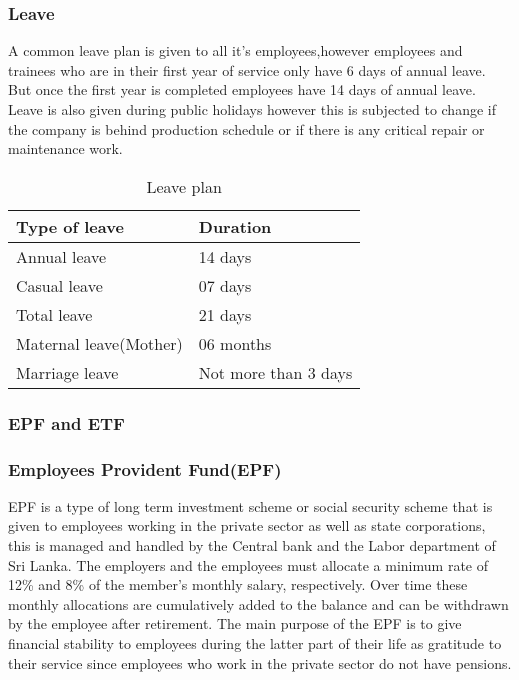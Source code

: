 \documentclass[a4paper,12pt]{article}
\begin{document}
			\subsubsection{Leave}
				A common leave plan is given to all it's employees,however employees and trainees who are in their first year of service only have 6 days of annual leave.
				But once the first year is completed employees have 14 days of annual leave.\\
				Leave is also given during public holidays however this is subjected to change if the company is behind production schedule or if there is any critical repair or maintenance work.\\
				\begin{table}[H]
					\centering
					\def\arraystrech{1.5}
						\begin{tabular}{|p{2 in}|p{2 in}|}
							\hline
							{\bf Type of leave}			&	{\bf Duration}	\\
							\hline
							Annual leave				&	14 days		\\
							\hline
							Casual leave				&	07 days		\\
							\hline
							Total leave					&	21 days		\\
							\hline
							Maternal leave(Mother)		&	06 months	\\
							\hline		
							Marriage leave				&	Not more than 3 days	\\	
							\hline					
						\end{tabular}
						\caption{Leave plan}
						\label{tab:Leave plan}
					\end{table}
					
			\subsubsection{EPF and ETF}
				
				\subsubsection*{Employees Provident Fund(EPF)}
				
				EPF is a type of long term investment scheme or social security scheme that is given to employees working in the private sector as well as state corporations, this is managed and handled by the Central bank and the Labor department of Sri Lanka.
				The employers and the employees must allocate a minimum rate of 12\% and 8\% of the member’s monthly salary, respectively.
				Over time these monthly allocations are cumulatively added to the balance and can be withdrawn by the employee after retirement.   
				The main purpose of the EPF is to give financial stability to employees during the latter part of their life as gratitude to their service since employees who work in the private sector do not have pensions.\\
				
\end{document}
